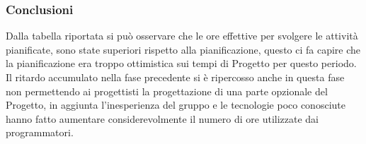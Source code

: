 \subsubsection{Conclusioni}

Dalla tabella riportata si può osservare che le ore effettive per svolgere le attività pianificate, sono state superiori rispetto alla pianificazione, questo ci fa capire che la pianificazione era troppo ottimistica sui tempi di Progetto per questo periodo.
Il ritardo accumulato nella fase precedente si è ripercosso anche in questa fase non permettendo ai progettisti la progettazione di una parte opzionale del Progetto, in aggiunta l'inesperienza del gruppo e le tecnologie poco conosciute hanno fatto aumentare considerevolmente il numero di ore utilizzate dai programmatori.





